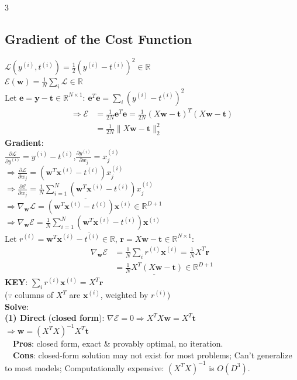 \documentclass[10pt]{article}
\newcommand{\vx}{\mathbf{x}}
\newcommand{\vw}{\mathbf{w}}
\newcommand{\vt}{\mathbf{t}}
\newcommand{\vr}{\mathbf{r}}
\newcommand{\cE}{\mathcal{E}}
\newcommand{\cL}{\mathcal{L}}
\begin{document}
\begin{multicols*}{3}
\subsection{Gradient of the Cost Function}
$\cL(y^{(i)},t^{(i)})=\frac12(y^{(i)}-t^{(i)})^2\in\mathbb R$\\
$\cE(\vw)=\frac1N\sum_i\cL\in\mathbb R$\\
Let $\mathbf e=\mathbf y-\vt\in\mathbb R^{N\times1}$: $\mathbf e^T\mathbf e=\sum_i(y^{(i)}-t^{(i)})^2$
\begin{align*}\Rightarrow\cE&=\tfrac1{2N}\mathbf e^T\mathbf e=\tfrac1{2N}(X\vw-\vt)^T(X\vw-\vt)\\&=\tfrac1{2N}\|X\vw-\vt\|_2^2\end{align*}
\textbf{Gradient}:\\
$\frac{\partial\cL}{\partial y^{(i)}}=y^{(i)}-t^{(i)}$,\quad $\frac{\partial y^{(i)}}{\partial w_j}=x_j^{(i)}$\\
$\Rightarrow\frac{\partial\cL}{\partial w_j}=(\vw^T\vx^{(i)}-t^{(i)})x_j^{(i)}$\\
$\Rightarrow\underline{\frac{\partial\cE}{\partial w_j}=\frac1N\sum_{i=1}^N(\vw^T\vx^{(i)}-t^{(i)})x_j^{(i)}}$\\
$\Rightarrow\nabla_\vw\cL=(\vw^T\vx^{(i)}-t^{(i)})\vx^{(i)}\in\mathbb R^{D+1}$\\
$\Rightarrow\underline{\nabla_\vw\cE=\frac1N\sum_{i=1}^N(\vw^T\vx^{(i)}-t^{(i)})\vx^{(i)}}$\\
Let $r^{(i)}=\vw^T\vx^{(i)}-t^{(i)}\in\mathbb R$, $\vr=X\vw-\vt\in\mathbb R^{N\times1}$:
\begin{align*}\nabla_\vw\cE&=\tfrac1N\textstyle\sum_i r^{(i)}\vx^{(i)}=\tfrac1NX^T\vr\\&=\underline{\tfrac1NX^T(X\vw-\vt)}\in\mathbb R^{D+1}\end{align*}
\textbf{KEY}: $\sum_i r^{(i)}\vx^{(i)}=X^T\vr$\\
($\because$ columns of $X^T$ are $\vx^{(i)}$, weighted by $r^{(i)}$)\\
\textbf{Solve}:\\
\textbf{(1) Direct} (\textbf{closed form}): $\nabla\cE=0\Rightarrow X^TX\vw=X^T\vt$\\
$\Rightarrow\vw=(X^TX)^{-1}X^T\vt$\\
\ \ \textbf{Pros}: closed form, exact \& provably optimal, no iteration.\\
\ \ \textbf{Cons}: closed-form solution may not exist for most problems; Can't generalize to most models; Computationally expensive: $(X^TX)^{-1}$ is $O(D^3)$.\\

\end{multicols*}
\end{document}

